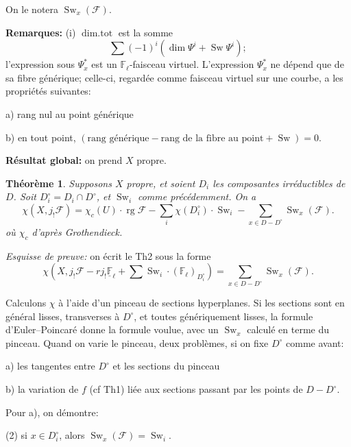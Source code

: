 \documentclass[11pt,a4paper]{article}
\theoremstyle{plain}
\newtheorem{theorem}{Th\'eor\`eme}
\theoremstyle{definition}
\DeclareMathOperator{\Sw}{Sw}
\DeclareMathOperator{\dimtot}{dim.tot}
\DeclareMathOperator{\rg}{rg}
\begin{document}
\medskip

On le notera $\Sw_x(\mathcal{F})$.

\medskip

\noindent \textbf{Remarques:} (i) $\dimtot$ est la somme
\[
\sum (-1)^i (\dim \Psi^i + \Sw \Psi^i);
\]
l'expression sous $\Psi_x^*$ est un $\mathbb{F}_\ell$-faisceau virtuel. L'expression $\Psi_x^*$ ne d\'epend que de sa fibre g\'en\'erique; celle-ci, regard\'ee comme faisceau virtuel sur une courbe, a les propri\'et\'es suivantes:

\qquad a) rang nul au point g\'en\'erique

\qquad b) en tout point, $(\text{rang g\'en\'erique} - \text{rang de la fibre au point} + \Sw) = 0$.

\medskip

\noindent \textbf{R\'esultat global:} on prend $X$ propre.

\newpage

\begin{theorem}
Supposons $X$ propre, et soient $D_i$ les composantes irr\'eductibles de $D$. Soit $D_i^\circ = D_i \cap D^\circ$, et $\Sw_i$ comme pr\'ec\'edemment. On a
\[
\chi(X, j_! \mathcal{F}) = \chi_c(U) \cdot \rg \mathcal{F} - \sum_i \chi(D_i^\circ) \cdot \Sw_i - \sum_{x \in D - D^\circ} \Sw_x(\mathcal{F}).
\]
o\`u $\chi_c$ d'apr\`es Grothendieck.
\end{theorem}

\medskip

\noindent \textit{Esquisse de preuve:} on \'ecrit le Th2 sous la forme
\[
\chi(X, j_! \mathcal{F} - r j_! \underline{\mathbb{F}}_\ell + \sum \Sw_i \cdot (\mathbb{F}_\ell)_{D_i^\circ}) = \sum_{x \in D - D^\circ} \Sw_x(\mathcal{F}).
\]

Calculons $\chi$ \`a l'aide d'un pinceau de sections hyperplanes. Si les sections sont en g\'en\'eral lisses, transverses \`a $D^\circ$, et toutes g\'en\'eriquement lisses, la formule d'Euler--Poincar\'e donne la formule voulue, avec un $\Sw_x$ calcul\'e en terme du pinceau. Quand on varie le pinceau, deux probl\`emes, si on fixe $D^\circ$ comme avant:

a) les tangentes entre $D^\circ$ et les sections du pinceau

b) la variation de $f$ (cf Th1) li\'ee aux sections passant par les points de $D - D^\circ$.

\medskip

Pour a), on d\'emontre:

(2) si $x \in D_i^\circ$, alors $\Sw_x(\mathcal{F}) = \Sw_i$.
\end{document}

